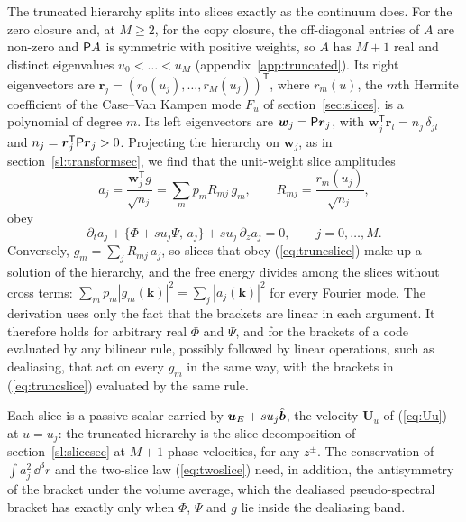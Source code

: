 The truncated hierarchy splits into slices exactly as the continuum does. For the zero closure and, at $M\ge2$, for the copy closure, the off-diagonal entries of $A$ are non-zero and $\mathsf P A$ is symmetric with positive weights, so $A$ has $M+1$ real and distinct eigenvalues $u_0<\dots<u_M$ (appendix~\ref{app:truncated}). Its right eigenvectors are $\boldsymbol r_j=(r_0(u_j),\dots,r_M(u_j))^{\mathsf T}$, where $r_m(u)$, the $m$th Hermite coefficient of the Case--Van Kampen mode $F_u$ of section~\ref{sec:slices}, is a polynomial of degree $m$. Its left eigenvectors are $\boldsymbol w_j=\mathsf P\boldsymbol r_j$, with $\boldsymbol w_j^{\mathsf T}\boldsymbol r_l=n_j\,\delta_{jl}$ and $n_j=\boldsymbol r_j^{\mathsf T}\mathsf P\boldsymbol r_j>0$. Projecting the hierarchy on $\boldsymbol w_j$, as in section~\ref{sl:transformsec}, we find that the unit-weight slice amplitudes
\begin{equation}\label{tr:aj}
  a_j=\frac{\boldsymbol w_j^{\mathsf T}g}{\sqrt{n_j}}=\sum_mp_mR_{mj}\,g_m,\qquad R_{mj}=\frac{r_m(u_j)}{\sqrt{n_j}},
\end{equation}
obey
\begin{equation}\label{eq:truncslice}
  \partial_ta_j+\{\Phi+su_j\Psi,\,a_j\}+su_j\,\partial_za_j=0,\qquad j=0,\dots,M .
\end{equation}
Conversely, $g_m=\sum_jR_{mj}\,a_j$, so slices that obey (\ref{eq:truncslice}) make up a solution of the hierarchy, and the free energy divides among the slices without cross terms: $\sum_mp_m|g_m(\boldsymbol k)|^2=\sum_j|a_j(\boldsymbol k)|^2$ for every Fourier mode. The derivation uses only the fact that the brackets are linear in each argument. It therefore holds for arbitrary real $\Phi$ and $\Psi$, and for the brackets of a code evaluated by any bilinear rule, possibly followed by linear operations, such as dealiasing, that act on every $g_m$ in the same way, with the brackets in (\ref{eq:truncslice}) evaluated by the same rule.

Each slice is a passive scalar carried by $\boldsymbol u_E+su_j\hat{\boldsymbol b}$, the velocity $\boldsymbol U_u$ of (\ref{eq:Uu}) at $u=u_j$: the truncated hierarchy is the slice decomposition of section~\ref{sl:slicesec} at $M+1$ phase velocities, for any $z^\pm$. The conservation of $\int a_j^2\,\dd^3r$ and the two-slice law (\ref{eq:twoslice}) need, in addition, the antisymmetry of the bracket under the volume average, which the dealiased pseudo-spectral bracket has exactly only when $\Phi$, $\Psi$ and $g$ lie inside the dealiasing band.

